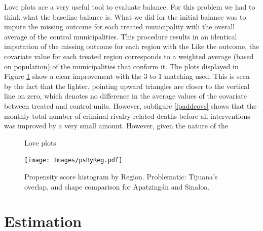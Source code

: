 \documentclass{article}[11 pt]
\begin{document}
Love plots are a very useful tool to evaluate balance. For this problem we had to think what the baseline balance is. What we did for the initial balance was to impute the missing outcome for each treated municipality with the overall average of the control municipalities. This procedure results in an identical imputation of the missing outcome for each region with the  Like the outcome, the covariate value for each treated region corresponds to a weighted average (based on population) of the municipalities that conform it. The plots displayed in Figure \ref{lpme} show a clear improvement with the 3 to 1 matching used. This is seen by the fact that the lighter, pointing upward triangles are closer to the vertical line on zero, which denotes no difference in the average values of the covariate between treated and control units. However, subfigure \ref{lpaddcovs} shows that the monthly total number of criminal rivalry related deaths before all interventions was improved by a very small amount. However, given the nature of the 

\begin{figure}[htdp]
	\centering
		\caption{Love plots}
		\label{lpme}
\end{figure}


	
\begin{figure}[htdp]		
	        \texttt{[image: Images/psByReg.pdf]}
	\caption{Propensity score histogram by Region. Problematic: Tijuana's overlap, and shape comparison for Apatzing\'{a}n and Sinaloa.}
\end{figure}	
			
\section{Estimation}
\end{document}
